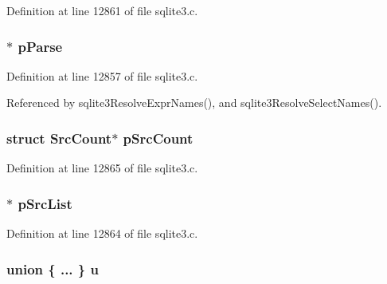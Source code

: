 Definition at line 12861 of file sqlite3.\+c.

\hypertarget{struct_walker_ac700bf257b32cd7e491fde90a081379d}{}
\subsubsection[{p\+Parse}]{$\ast$ p\+Parse}\label{struct_walker_ac700bf257b32cd7e491fde90a081379d}


Definition at line 12857 of file sqlite3.\+c.



Referenced by sqlite3\+Resolve\+Expr\+Names(), and sqlite3\+Resolve\+Select\+Names().

\hypertarget{struct_walker_a5d5aea732b321028a8180029ddc6157c}{}
\subsubsection[{p\+Src\+Count}]{\setlength{\rightskip}{0pt plus 5cm}struct {\bf Src\+Count}$\ast$ p\+Src\+Count}\label{struct_walker_a5d5aea732b321028a8180029ddc6157c}


Definition at line 12865 of file sqlite3.\+c.

\hypertarget{struct_walker_afbf9e5f3766df361d597cbcaba479e1d}{}
\subsubsection[{p\+Src\+List}]{$\ast$ p\+Src\+List}\label{struct_walker_afbf9e5f3766df361d597cbcaba479e1d}


Definition at line 12864 of file sqlite3.\+c.

\hypertarget{struct_walker_a045a298b470ad98c35b51f7dbe60c0be}{}
\subsubsection[{u}]{\setlength{\rightskip}{0pt plus 5cm}union \{ ... \}   u}\label{struct_walker_a045a298b470ad98c35b51f7dbe60c0be}
\hypertarget{struct_walker_a3408c16f995f9fbf7a7f0199b3e6658c}{}
